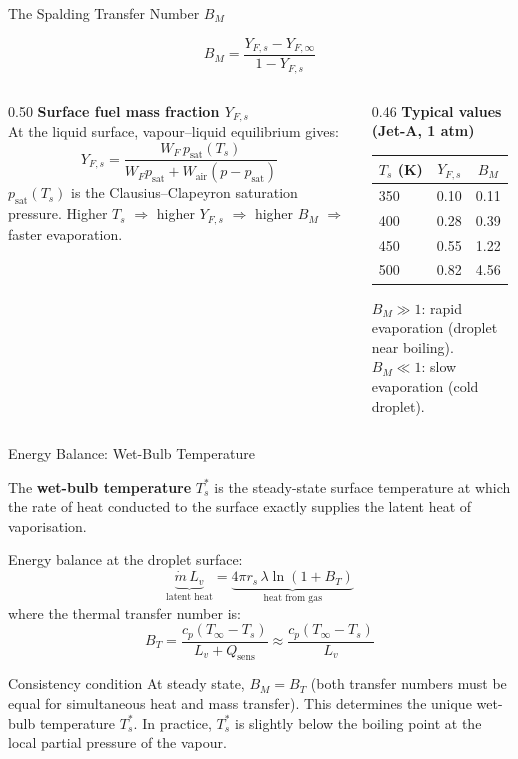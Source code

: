 \documentclass[12pt,aspectratio=169]{beamer}
\newcommand{\mdot}{\dot{m}}
\newcommand{\Ts}{T_s}
\newcommand{\Tinf}{T_\infty}
\newcommand{\Yfs}{Y_{F,s}}
\newcommand{\Yfinf}{Y_{F,\infty}}
\newcommand{\rs}{r_s}
\newcommand{\BM}{B_M}
\newcommand{\BT}{B_T}
\begin{document}
\begin{frame}{The Spalding Transfer Number $\BM$}

  \[
    \BM = \frac{\Yfs - \Yfinf}{1 - \Yfs}
  \]

  \begin{columns}[t]
    \begin{column}{0.50\textwidth}
      \textbf{Surface fuel mass fraction $\Yfs$}\\[4pt]
      At the liquid surface, vapour--liquid equilibrium gives:
      \[
        \Yfs = \frac{W_F\,p_{\text{sat}}(\Ts)}
                    {W_F p_{\text{sat}} + W_{\text{air}}(p - p_{\text{sat}})}
      \]
      $p_{\text{sat}}(\Ts)$ is the Clausius--Clapeyron
      saturation pressure.
      Higher $\Ts$ $\Rightarrow$ higher $\Yfs$
      $\Rightarrow$ higher $\BM$ $\Rightarrow$ faster evaporation.
    \end{column}
    \begin{column}{0.46\textwidth}
      \textbf{Typical values (Jet-A, 1 atm)}
      \begin{center}
      \renewcommand{\arraystretch}{1.3}
      \begin{tabular}{lcc}
        \toprule
        $\Ts$ (K) & $\Yfs$ & $\BM$ \\
        \midrule
        350 & 0.10 & 0.11 \\
        400 & 0.28 & 0.39 \\
        450 & 0.55 & 1.22 \\
        500 & 0.82 & 4.56 \\
        \bottomrule
      \end{tabular}
      \end{center}
      \small $\BM \gg 1$: rapid evaporation (droplet near boiling).\\
      $\BM \ll 1$: slow evaporation (cold droplet).
    \end{column}
  \end{columns}
\end{frame}

\begin{frame}{Energy Balance: Wet-Bulb Temperature}

  The \textbf{wet-bulb temperature} $\Ts^*$ is the steady-state
  surface temperature at which the rate of heat conducted to the
  surface exactly supplies the latent heat of vaporisation.

  \medskip
  Energy balance at the droplet surface:
  \[
    \underbrace{\mdot\,L_v}_{\text{latent heat}}
    = \underbrace{4\pi\rs\,\lambda\ln(1+\BT)}_{\text{heat from gas}}
  \]
  where the \alert{thermal transfer number} is:
  \[
    \BT = \frac{c_p(\Tinf - \Ts)}{L_v + Q_{\text{sens}}}
    \approx \frac{c_p(\Tinf - \Ts)}{L_v}
  \]

  \begin{block}{Consistency condition}
    At steady state, $\BM = \BT$ (both transfer numbers must be equal
    for simultaneous heat and mass transfer).
    This determines the unique wet-bulb temperature $\Ts^*$.
    In practice, $\Ts^*$ is slightly below the boiling point at
    the local partial pressure of the vapour.
  \end{block}
\end{frame}
\end{document}
